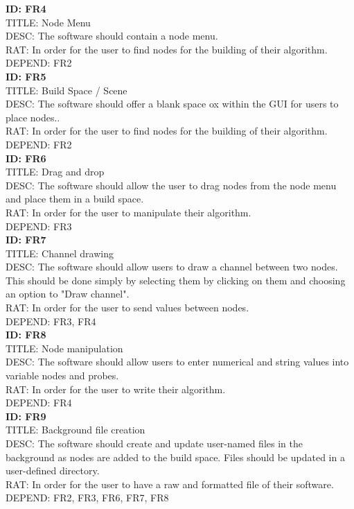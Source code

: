 \documentclass[journal,10pt,onecolumn,compsoc]{IEEEtran} \usepackage[margin=1.0in]{geometry} \usepackage{pdfpages} \usepackage{graphicx}
\begin{document}
\noindent
\textbf{ID: FR4}\\
TITLE: Node Menu\\
DESC: The software should contain a node menu.\\
RAT: In order for the user to find nodes for the building of their algorithm.\\
DEPEND: FR2\\

\noindent
\textbf{ID: FR5}\\
TITLE: Build Space / Scene\\
DESC: The software should offer a blank space ox within the GUI for users to place nodes..\\
RAT: In order for the user to find nodes for the building of their algorithm.\\
DEPEND: FR2\\

\noindent
\textbf{ID: FR6}\\
TITLE: Drag and drop\\
DESC: The software should allow the user to drag nodes from the node menu and place them in a build space.\\
RAT: In order for the user to manipulate their algorithm.\\
DEPEND: FR3\\

\noindent
\textbf{ID: FR7}\\
TITLE: Channel drawing\\
DESC: The software should allow users to draw a channel between two nodes. 
This should be done simply by selecting them by clicking on them and choosing an option to "Draw channel".\\
RAT: In order for the user to send values between nodes.\\
DEPEND: FR3, FR4\\

\noindent
\textbf{ID: FR8}\\
TITLE: Node manipulation\\
DESC: The software should allow users to enter numerical and string values into variable nodes and probes.\\
RAT: In order for the user to write their algorithm.\\
DEPEND: FR4\\

\noindent
\textbf{ID: FR9}\\
TITLE: Background file creation\\
DESC: The software should create and update user-named files in the background as nodes are added to the build space. 
Files should be updated in a user-defined directory.\\
RAT: In order for the user to have a raw and formatted file of their software.\\
DEPEND: FR2, FR3, FR6, FR7, FR8\\
\end{document}
